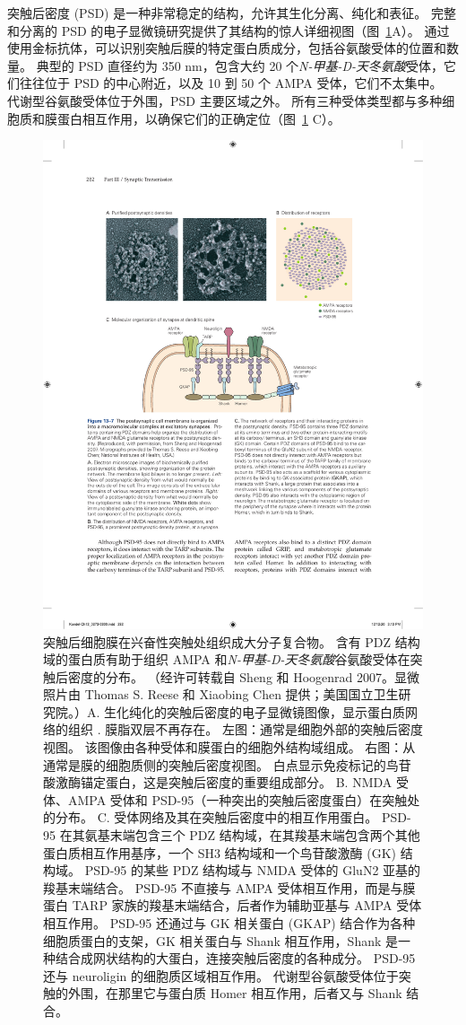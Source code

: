 突触后密度 (PSD) 是一种非常稳定的结构，允许其生化分离、纯化和表征。
完整和分离的 PSD 的电子显微镜研究提供了其结构的惊人详细视图（图~\ref{fig:13_7}A）。 
通过使用金标抗体，可以识别突触后膜的特定蛋白质成分，包括谷氨酸受体的位置和数量。
典型的 PSD 直径约为 350 nm，包含大约 20 个\textit{N-甲基-D-天冬氨酸}受体，它们往往位于 PSD 的中心附近，以及 10 到 50 个 AMPA 受体，它们不太集中。
代谢型谷氨酸受体位于外围，PSD 主要区域之外。
所有三种受体类型都与多种细胞质和膜蛋白相互作用，以确保它们的正确定位（图~\ref{fig:13_7} C）。


\begin{figure}[htbp]
	\centering
	\includegraphics[width=0.7\linewidth]{chap13/fig_13_7}
	\caption{突触后细胞膜在兴奋性突触处组织成大分子复合物。 含有 PDZ 结构域的蛋白质有助于组织 AMPA 和\textit{N-甲基-D-天冬氨酸}谷氨酸受体在突触后密度的分布。 （经许可转载自 Sheng 和 Hoogenrad 2007。显微照片由 Thomas S. Reese 和 Xiaobing Chen 提供；美国国立卫生研究院。）A. 生化纯化的突触后密度的电子显微镜图像，显示蛋白质网络的组织 . 膜脂双层不再存在。 左图：通常是细胞外部的突触后密度视图。 该图像由各种受体和膜蛋白的细胞外结构域组成。 右图：从通常是膜的细胞质侧的突触后密度视图。 白点显示免疫标记的鸟苷酸激酶锚定蛋白，这是突触后密度的重要组成部分。 B. NMDA 受体、AMPA 受体和 PSD-95（一种突出的突触后密度蛋白）在突触处的分布。 C. 受体网络及其在突触后密度中的相互作用蛋白。 PSD-95 在其氨基末端包含三个 PDZ 结构域，在其羧基末端包含两个其他蛋白质相互作用基序，一个 SH3 结构域和一个鸟苷酸激酶 (GK) 结构域。 PSD-95 的某些 PDZ 结构域与 NMDA 受体的 GluN2 亚基的羧基末端结合。 PSD-95 不直接与 AMPA 受体相互作用，而是与膜蛋白 TARP 家族的羧基末端结合，后者作为辅助亚基与 AMPA 受体相互作用。 PSD-95 还通过与 GK 相关蛋白 (GKAP) 结合作为各种细胞质蛋白的支架，GK 相关蛋白与 Shank 相互作用，Shank 是一种结合成网状结构的大蛋白，连接突触后密度的各种成分。 PSD-95 还与 neuroligin 的细胞质区域相互作用。 代谢型谷氨酸受体位于突触的外围，在那里它与蛋白质 Homer 相互作用，后者又与 Shank 结合。}
	\label{fig:13_7}
\end{figure}


